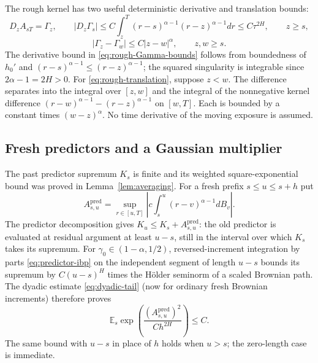 \documentclass[11pt,a4paper]{amsart}
\theoremstyle{plain}
\theoremstyle{definition}
\theoremstyle{remark}
\newcommand{\EE}{\mathbb{E}}
\newcommand{\Es}{\EE_s}
\newcommand{\pred}{\mathrm{pred}}
\begin{document}
The rough kernel has two useful deterministic derivative and translation bounds:
\begin{equation}\label{eq:rough-Gamma-bounds}
 D_zA_{sT}=\Gamma_z,\qquad
 |D_z\Gamma_s|\le C\int_z^T(r-s)^{\alpha-1}(r-z)^{\alpha-1}dr
                  \le C\tau^{2H},\qquad z\ge s,
\end{equation}
\begin{equation}\label{eq:rough-translation}
 |\Gamma_z-\Gamma_w|\le C|z-w|^\alpha,\qquad z,w\ge s.
\end{equation}
The derivative bound in \eqref{eq:rough-Gamma-bounds} follows from boundedness of $h_0'$ and $(r-s)^{\alpha-1}\le(r-z)^{\alpha-1}$; the squared singularity is integrable since $2\alpha-1=2H>0$. For \eqref{eq:rough-translation}, suppose $z<w$. The difference separates into the integral over $[z,w]$ and the integral of the nonnegative kernel difference $(r-w)^{\alpha-1}-(r-z)^{\alpha-1}$ on $[w,T]$. Each is bounded by a constant times $(w-z)^\alpha$. No time derivative of the moving exposure is assumed.

\subsection{Fresh predictors and a Gaussian multiplier}
The past predictor supremum $K_s$ is finite and its weighted square-exponential bound was proved in Lemma~\ref{lem:averaging}. For a fresh prefix $s\le u\le s+h$ put
\[
 A_{s,u}^{\pred}=\sup_{r\in[u,T]}
       \left|c\int_s^u(r-v)^{\alpha-1}dB_v\right|.
\]
The predictor decomposition gives $K_u\le K_s+A_{s,u}^{\pred}$: the old predictor is evaluated at residual argument at least $u-s$, still in the interval over which $K_s$ takes its supremum. For $\gamma_0\in(1-\alpha,1/2)$, reversed-increment integration by parts \eqref{eq:predictor-ibp} on the independent segment of length $u-s$ bounds its supremum by $C(u-s)^H$ times the H\"older seminorm of a scaled Brownian path. The dyadic estimate \eqref{eq:dyadic-tail} (now for ordinary fresh Brownian increments) therefore proves
\begin{equation}\label{eq:fresh-predictor-moment}
 \Es\exp\left(\frac{(A_{s,u}^{\pred})^2}{C h^{2H}}\right)\le C.
\end{equation}
The same bound with $u-s$ in place of $h$ holds when $u>s$; the zero-length case is immediate.
\end{document}
